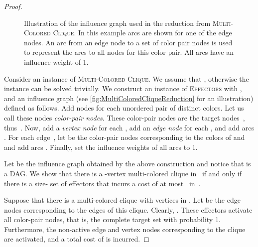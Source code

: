 \documentclass{article}
\newcommand{\probColorClique}{\textsc{Multi-Colored Clique}\xspace}
\newcommand{\probEffectors}{\textsc{Effectors}\xspace}
\begin{document}
\begin{proof}
\begin{figure}[t]
  \caption{Illustration of the influence graph used in the reduction from \probColorClique.
  In this example arcs are shown for one of the edge nodes.
  An arc from an edge node to a set of color pair nodes is used to represent the  arcs to all nodes for this color pair.
  All arcs have an influence weight of 1.}
  \label{fig:MultiColoredCliqueReduction}
\end{figure}    
    
    
  Consider an instance  of \probColorClique.
  We assume that , otherwise the instance can be solved trivially.
  We construct an instance of \probEffectors with ,  and an influence graph (see \autoref{fig:MultiColoredCliqueReduction} for an illustration) defined
  as follows.
  Add  nodes for each unordered pair of distinct colors.
  Let us call these nodes \emph{color-pair nodes}. These color-pair nodes are the target nodes~, thus~.
  Now, add a \emph{vertex node}  for each ,
  add an \emph{edge node}  for each ,
  and add arcs .
  For each edge~, let  be the color-pair nodes corresponding to the
  colors of  and  and add arcs .
  Finally, set the influence weights of all arcs to 1.
  
  Let  be the influence graph obtained by the above construction
  and notice that  is a DAG.
  We show that there is a -vertex multi-colored clique in~ if
  and only if there is a size- set of effectors that incurs a
  cost of at most~ in~.
   
  Suppose that there is a multi-colored clique with  vertices in
  . Let  be the edge nodes corresponding to the edges of this
  clique.
  Clearly, . These effectors activate all
  color-pair nodes, that is, the complete target set  with
  probability 1.
  Furthermore, the non-active edge and vertex nodes corresponding to the
  clique are activated, and a total cost of  is
  incurred.
   

\end{proof}
\end{document}
